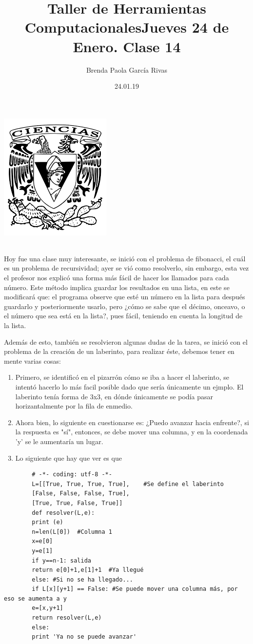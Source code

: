 \documentclass{article}
\title{\huge \color{red}Taller de Herramientas Computacionales}
\author{Brenda Paola García Rivas}
\date{24.01.19}
\begin{document}
	\maketitle
	\begin{center}
		\includegraphics [scale=1.5]{1.png}
	\end{center}

	\newpage
	\title{\huge Jueves 24 de Enero. Clase 14}\\
	
	Hoy fue una clase muy interesante, se inició con el problema de fibonacci, el cuál es un problema de recursividad; ayer se vió como resolverlo, sin embargo, esta vez el profesor nos explicó una forma más fácil de hacer los llamados para cada número. 
	Este método implica guardar los resultados en una lista, en este se modificará que: el programa observe que esté un número en la lista para después guardarlo y posteriormente usarlo, pero ¿cómo se sabe que el décimo, onceavo, o el número que sea está en la lista?, pues fácil, teniendo en cuenta la longitud de la lista.
	
	Además de esto, también se resolvieron algunas dudas de la tarea, se inició con el problema de la creación de un laberinto, para realizar éste, debemos tener en mente varias cosas:
	\begin{enumerate}
		\item 
	Primero, se identificó en el pizarrón cómo se iba a hacer el laberinto, se intentó hacerlo lo más facil posible dado que sería únicamente un ejmplo. El laberinto tenía forma de 3x3, en dónde únicamente se podía pasar horizantalmente por la fila de enmedio.
		\item 
	Ahora bien, lo siguiente en cuestionarse es: ¿Puedo avanzar hacia enfrente?, si la respuesta es "sí", entonces, se debe mover una columna, y en la coordenada 'y' se le aumentaría un lugar.
		\item 
	Lo siguiente que hay que ver es que 
	\end{enumerate}
	\begin{verbatim}
		# -*- coding: utf-8 -*-
		L=[[True, True, True, True],    #Se define el laberinto
		[False, False, False, True],
		[True, True, False, True]]
		def resolver(L,e):
		print (e)
		n=len(L[0])  #Columna 1
		x=e[0]
		y=e[1]
		if y==n-1: salida
		return e[0]+1,e[1]+1  #Ya llegué
		else: #Si no se ha llegado...
		if L[x][y+1] == False: #Se puede mover una columna más, por eso se aumenta a y 
		e=[x,y+1]
		return resolver(L,e)
		else:
		print 'Ya no se puede avanzar'
	\end{verbatim}
\end{document}
